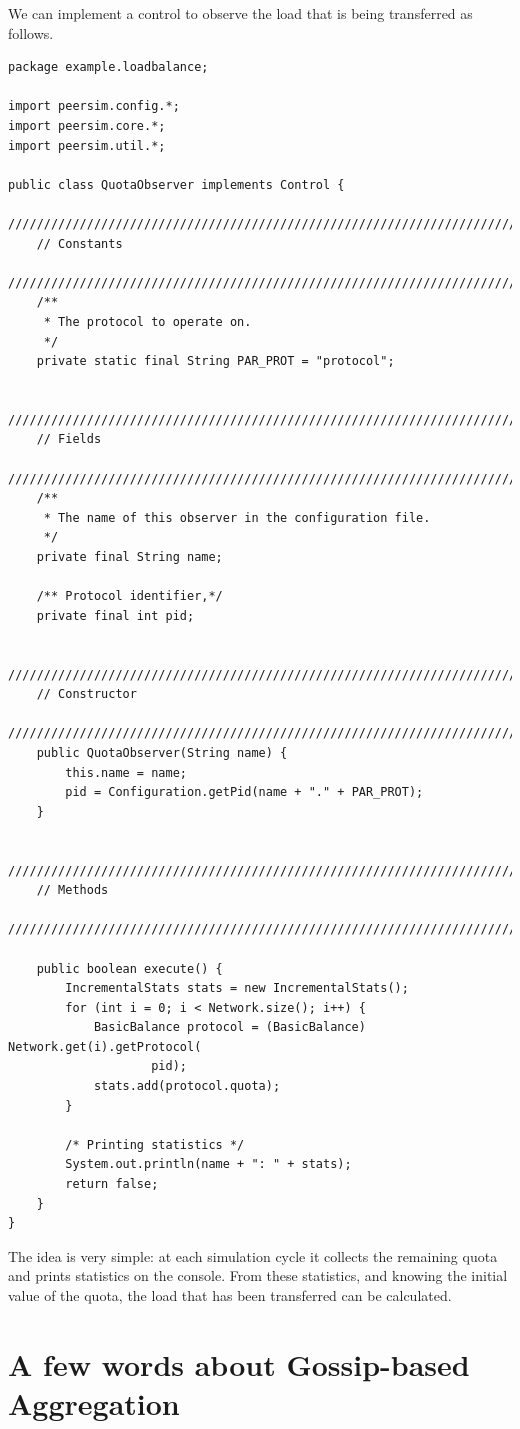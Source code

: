 \documentclass[a4paper,11pt]{article}
\begin{document}
We can implement a control to observe the load that is being transferred
as follows.

\footnotesize
\begin{verbatim}
package example.loadbalance;

import peersim.config.*;
import peersim.core.*;
import peersim.util.*;

public class QuotaObserver implements Control {
    /////////////////////////////////////////////////////////////////////////
    // Constants
    /////////////////////////////////////////////////////////////////////////
    /**
     * The protocol to operate on.
     */
    private static final String PAR_PROT = "protocol";

    /////////////////////////////////////////////////////////////////////////
    // Fields
    /////////////////////////////////////////////////////////////////////////
    /**
     * The name of this observer in the configuration file.
     */
    private final String name;

    /** Protocol identifier,*/
    private final int pid;

    /////////////////////////////////////////////////////////////////////////
    // Constructor
    /////////////////////////////////////////////////////////////////////////
    public QuotaObserver(String name) {
        this.name = name;
        pid = Configuration.getPid(name + "." + PAR_PROT);
    }

    /////////////////////////////////////////////////////////////////////////
    // Methods
    /////////////////////////////////////////////////////////////////////////

    public boolean execute() {
        IncrementalStats stats = new IncrementalStats();
        for (int i = 0; i < Network.size(); i++) {
            BasicBalance protocol = (BasicBalance) Network.get(i).getProtocol(
                    pid);
            stats.add(protocol.quota);
        }

        /* Printing statistics */
        System.out.println(name + ": " + stats);
        return false;
    }
}
\end{verbatim}
\normalsize

The idea is very simple: at each simulation cycle it collects
the remaining quota and prints statistics on the console.
From these statistics, and knowing the initial value of the quota,
the load that has been transferred can be calculated.


\appendix
\section{\label{sec:Appendix-A-aggregation}A few words about
Gossip-based Aggregation}
\end{document}
